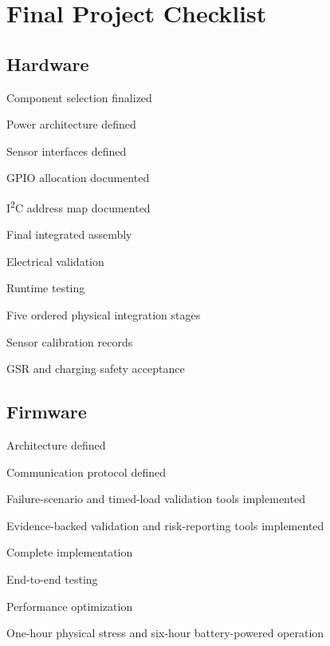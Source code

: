 \section{Final Project Checklist}
\label{sec:final-project-checklist}

\subsection{Hardware}
\label{sec:checklist-hardware}

\begin{donelist}
    \item Component selection finalized
    \item Power architecture defined
    \item Sensor interfaces defined
    \item GPIO allocation documented
    \item I\textsuperscript{2}C address map documented
\end{donelist}
\begin{checklist}
    \item Final integrated assembly
    \item Electrical validation
    \item Runtime testing
    \item Five ordered physical integration stages
    \item Sensor calibration records
    \item GSR and charging safety acceptance
\end{checklist}

\subsection{Firmware}
\label{sec:checklist-firmware}

\begin{donelist}
    \item Architecture defined
    \item Communication protocol defined
    \item Failure-scenario and timed-load validation tools implemented
    \item Evidence-backed validation and risk-reporting tools implemented
\end{donelist}
\begin{checklist}
    \item Complete implementation
    \item End-to-end testing
    \item Performance optimization
    \item One-hour physical stress and six-hour battery-powered operation
\end{checklist}

